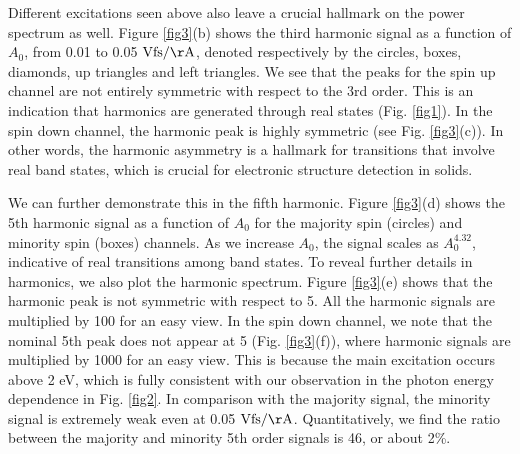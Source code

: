 \documentclass[checkin,showpacs,psfig,aps,pra]{revtex4}
\begin{document}
Different excitations seen above also leave a crucial hallmark on the
power spectrum as well. Figure \ref{fig3}(b) shows the third harmonic
signal as a function of $A_0$, from 0.01 to 0.05 $\rm Vfs/\AA$,
denoted respectively by the circles, boxes, diamonds, up triangles and
left triangles. We see that the peaks for the spin up channel are not
entirely symmetric with respect to the 3rd order. This is an
indication that harmonics are generated through real states
(Fig. \ref{fig1}).  In the spin down channel, the harmonic peak is
highly symmetric (see Fig. \ref{fig3}(c)). In other words, the
harmonic asymmetry is a hallmark for transitions that involve real
band states, which is crucial for electronic structure detection in
solids.

 We can further demonstrate this in the fifth harmonic. Figure
 \ref{fig3}(d) shows the 5th harmonic signal as a function of $A_0$
 for the majority spin (circles) and minority spin (boxes)
 channels. As we increase $A_0$, the signal scales as $A_0^{4.32}$,
 indicative of real transitions among band states.  To reveal further
 details in harmonics, we also plot the harmonic spectrum. Figure
 \ref{fig3}(e) shows that the harmonic peak is not symmetric with
 respect to 5.  All the harmonic signals are multiplied by 100 for an
 easy view.  In the spin down channel, we note that the nominal 5th
 peak does not appear at 5 (Fig. \ref{fig3}(f)), where harmonic
 signals are multiplied by 1000 for an easy view.  This is because the
 main excitation occurs above 2 eV, which is fully consistent with our
 observation in the photon energy dependence in Fig. \ref{fig2}.  In
 comparison with the majority signal, the minority signal is extremely
 weak even at 0.05 $\rm Vfs/\AA$. Quantitatively, we find the ratio
 between the majority and minority 5th order signals is 46, or about
 2\%.
\end{document}

